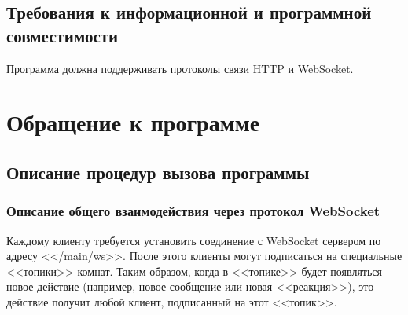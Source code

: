 \documentclass{../includes/TechDoc}
\begin{document}
    \subsection{Требования к информационной и программной совместимости}

    Программа должна поддерживать протоколы связи HTTP и WebSocket.

    \section{Обращение к программе}

    \subsection{Описание процедур вызова программы}

    \subsubsection{Описание общего взаимодействия через протокол WebSocket}

    Каждому клиенту требуется установить соединение с WebSocket сервером по адресу <</main/ws>>.
    После этого клиенты могут подписаться на специальные <<топики>> комнат.
    Таким образом, когда в <<топике>> будет появляться новое действие (например, новое сообщение или новая <<реакция>>), это действие получит любой клиент, подписанный на этот <<топик>>.
\end{document}
